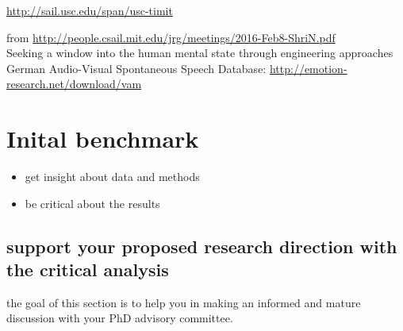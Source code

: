 \url{http://sail.usc.edu/span/usc-timit}

from \url{http://people.csail.mit.edu/jrg/meetings/2016-Feb8-ShriN.pdf}\\

Seeking a window into the human mental state through engineering approaches\\

German Audio-Visual Spontaneous Speech Database:
\url{http://emotion-research.net/download/vam}


\section{Inital benchmark}

\begin{itemize}
\item get insight about data and methods
\item be critical about the results
\end{itemize}



\subsection{support your proposed research direction with the critical analysis}
the goal of this section is to help you in making an informed and mature discussion with your PhD advisory committee.


